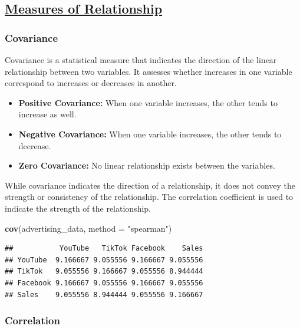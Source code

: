 \documentclass[
]{article}
\newenvironment{Shaded}{\begin{snugshade}}{\end{snugshade}}
\newcommand{\AttributeTok}[1]{\textcolor[rgb]{0.13,0.29,0.53}{#1}}
\newcommand{\FunctionTok}[1]{\textcolor[rgb]{0.13,0.29,0.53}{\textbf{#1}}}
\newcommand{\NormalTok}[1]{#1}
\newcommand{\StringTok}[1]{\textcolor[rgb]{0.31,0.60,0.02}{#1}}
\begin{document}
\subsection{\texorpdfstring{\ul{\textbf{Measures of
Relationship}}}{Measures of Relationship}}\label{measures-of-relationship}

\subsubsection{\texorpdfstring{\textbf{Covariance}}{Covariance}}\label{covariance}

Covariance is a statistical measure that indicates the direction of the
linear relationship between two variables. It assesses whether increases
in one variable correspond to increases or decreases in
another.\hspace{0pt}

\begin{itemize}
\item
  \textbf{Positive Covariance:} When one variable increases, the other
  tends to increase as well.
\item
  \textbf{Negative Covariance:} When one variable increases, the other
  tends to decrease.
\item
  \textbf{Zero Covariance:} No linear relationship exists between the
  variables.
\end{itemize}

While covariance indicates the direction of a relationship, it does not
convey the strength or consistency of the relationship. The correlation
coefficient is used to indicate the strength of the relationship.

\begin{Shaded}
\begin{Highlighting}[]
\FunctionTok{cov}\NormalTok{(advertising\_data, }\AttributeTok{method =} \StringTok{"spearman"}\NormalTok{)}
\end{Highlighting}
\end{Shaded}

\begin{verbatim}
##           YouTube   TikTok Facebook    Sales
## YouTube  9.166667 9.055556 9.166667 9.055556
## TikTok   9.055556 9.166667 9.055556 8.944444
## Facebook 9.166667 9.055556 9.166667 9.055556
## Sales    9.055556 8.944444 9.055556 9.166667
\end{verbatim}

\subsubsection{\texorpdfstring{\textbf{Correlation}}{Correlation}}\label{correlation}
\end{document}
